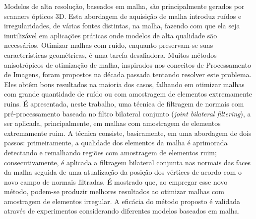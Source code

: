 Modelos de alta resolução, baseados em malha, são principalmente gerados por scanners ópticos 3D. Esta abordagem de aquisição de malha introduz ruídos e irregularidades, de várias fontes distintas, na malha, fazendo com que ela seja inutilizável em aplicações práticas onde modelos de alta qualidade são necessários. Otimizar malhas com ruído, enquanto preservam-se suas características geométricas, é uma tarefa desafiadora. Muitos métodos anisotrópicos de otimização de malha, inspirados nos conceitos de Processamento de Imagens, foram propostos na década passada tentando resolver este problema. Eles obtêm bons resultados na maioria dos casos, falhando em otimizar malhas com grande quantidade de ruído ou com amostragem de elementos extremamente ruins. É apresentada, neste trabalho, uma técnica de filtragem de normais com pré-processamento baseada no filtro bilateral conjunto (\textit{joint bilateral filtering}), a ser aplicada, principalmente, em malhas com amostragem de elementos extremamente ruim. A técnica consiste, basicamente, em uma abordagem de dois passos: primeiramente, a qualidade dos elementos da malha é aprimorada detectando e remalhando regiões com amostragem de elementos ruim; consecutivamente, é aplicada a filtragem bilateral conjunta nas normais das faces da malha seguida de uma atualização da posição dos vértices de acordo com o novo campo de normais filtradas. É mostrado que, ao empregar esse novo método, podem-se produzir melhores resultados ao otimizar malhas com amostragem de elementos irregular. A eficácia do método proposto é validada através de experimentos considerando diferentes modelos baseados em malha. 
 


